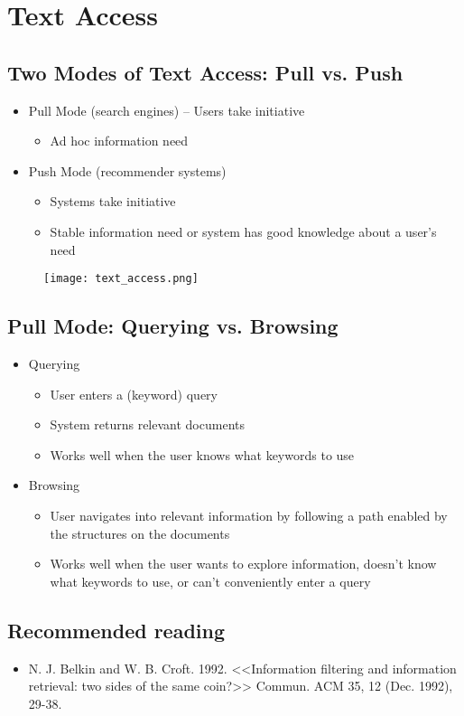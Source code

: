 \section{Text Access}

\subsection{Two Modes of Text Access: Pull vs. Push}
\begin{itemize}
\item Pull Mode (search engines) – Users take initiative
    \begin{itemize}
    \item Ad hoc information need
    \end{itemize}
\item Push Mode (recommender systems)
    \begin{itemize}
    \item Systems take initiative
    \item Stable information need or system has good knowledge about a user’s need
    \end{itemize}
\end{itemize}


\begin{figure}[H]
    \centering
    \texttt{[image: text\_access.png]}
\end{figure}


\subsection{Pull Mode: Querying vs. Browsing}
\begin{itemize}
\item Querying
    \begin{itemize}
    \item User enters a (keyword) query
    \item System returns relevant documents
    \item Works well when the user knows what keywords to use
    \end{itemize}
\item Browsing
    \begin{itemize}
    \item User navigates into relevant information by following a path
enabled by the structures on the documents
    \item Works well when the user wants to explore information, doesn’t know what keywords to use, or can’t conveniently enter a query
    \end{itemize}
\end{itemize}


\subsection{Recommended reading}
\begin{itemize}
\item N. J. Belkin and W. B. Croft. 1992. <<Information filtering and information retrieval: two sides of the same coin?>> Commun. ACM 35, 12 (Dec. 1992), 29-38.
\end{itemize}
